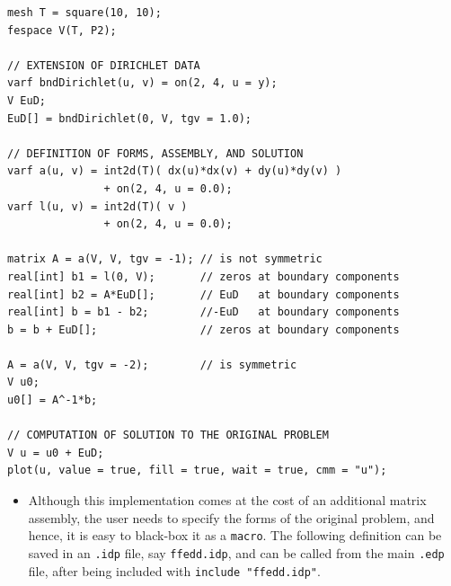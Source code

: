 \documentclass[9pt]{amsart}
\theoremstyle{remark}
\theoremstyle{definition}
\begin{document}
\begin{Verbatim}[commandchars=\\\{\}]
mesh T = square(10, 10);
fespace V(T, P2);

// EXTENSION OF DIRICHLET DATA
varf bndDirichlet(u, v) = on(2, 4, u = y);
V EuD;
EuD[] = bndDirichlet(0, V, tgv = 1.0);

// DEFINITION OF FORMS, ASSEMBLY, AND SOLUTION
varf a(u, v) = int2d(T)( dx(u)*dx(v) + dy(u)*dy(v) )
               + on(2, 4, u = 0.0);
varf l(u, v) = int2d(T)( v )
               + on(2, 4, u = 0.0);

matrix A = a(V, V, tgv = -1); // is not symmetric
real[int] b1 = l(0, V);       // zeros at boundary components
real[int] b2 = A*EuD[];       // EuD   at boundary components
real[int] b = b1 - b2;        //-EuD   at boundary components
b = b + EuD[];                // zeros at boundary components

A = a(V, V, tgv = -2);        // is symmetric
V u0;
u0[] = A^-1*b;

// COMPUTATION OF SOLUTION TO THE ORIGINAL PROBLEM
V u = u0 + EuD;
plot(u, value = true, fill = true, wait = true, cmm = "u");
\end{Verbatim}

\begin{itemize}
\item Although this implementation comes at the cost of an additional matrix assembly, the user needs to specify the forms of the original problem, and hence, it is easy to black-box it as a \verb!macro!. The following definition can be saved in an \verb!.idp! file, say \verb!ffedd.idp!, and can be called from the main \verb!.edp! file, after being included with \verb!include "ffedd.idp"!.
\end{itemize}
\end{document}
